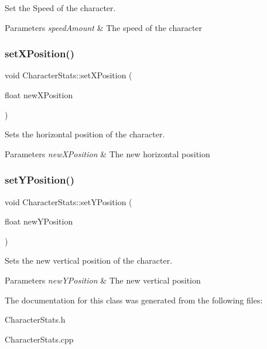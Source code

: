 Set the Speed of the character. 


\begin{DoxyParams}{Parameters}
{\em speed\+Amount} & The speed of the character \\
\hline
\end{DoxyParams}
\mbox{\label{classCharacterStats_a46c3cc5fce4e17bccb2a3b690f3ac7aa}} 
\subsubsection{\texorpdfstring{setXPosition()}{setXPosition()}}
{\footnotesize\ttfamily void Character\+Stats\+::set\+X\+Position (\begin{DoxyParamCaption}\item[{float}]{new\+X\+Position }\end{DoxyParamCaption})\hspace{0.3cm}{\ttfamily [inline]}}



Sets the horizontal position of the character. 


\begin{DoxyParams}{Parameters}
{\em new\+X\+Position} & The new horizontal position \\
\hline
\end{DoxyParams}
\mbox{\label{classCharacterStats_ab1ff93a3f5a89c57092b52ee6df40061}} 
\subsubsection{\texorpdfstring{setYPosition()}{setYPosition()}}
{\footnotesize\ttfamily void Character\+Stats\+::set\+Y\+Position (\begin{DoxyParamCaption}\item[{float}]{new\+Y\+Position }\end{DoxyParamCaption})\hspace{0.3cm}{\ttfamily [inline]}}



Sets the new vertical position of the character. 


\begin{DoxyParams}{Parameters}
{\em new\+Y\+Position} & The new vertical position \\
\hline
\end{DoxyParams}


The documentation for this class was generated from the following files\+:\begin{DoxyCompactItemize}
\item 
Character\+Stats.\+h\item 
Character\+Stats.\+cpp\end{DoxyCompactItemize}
